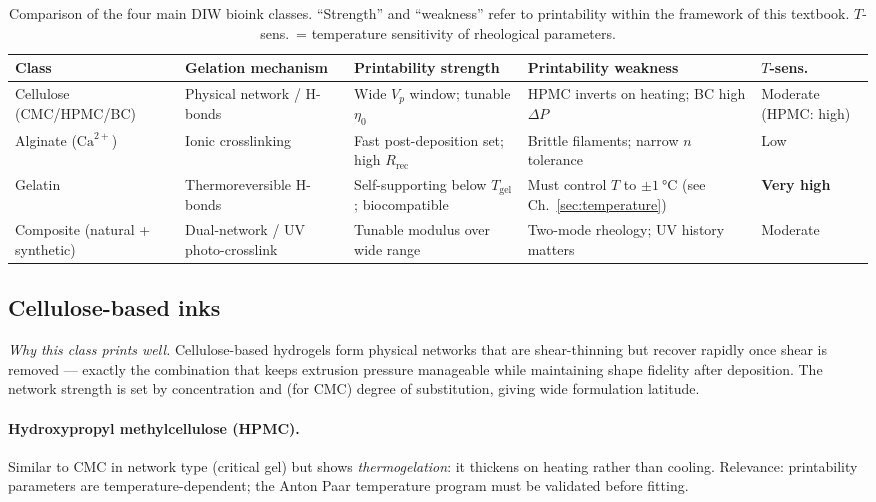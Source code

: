 \documentclass[11pt,a4paper]{article}
\begin{document}
\begin{table}[h]
\centering
\caption{Comparison of the four main DIW bioink classes. ``Strength''
and ``weakness'' refer to printability within the framework of this
textbook. $T$-sens.\ = temperature sensitivity of rheological parameters.}
\label{tab:material_classes}
\small
\begin{tabular}{@{}lllll@{}}
\toprule
\textbf{Class} & \textbf{Gelation mechanism} & \textbf{Printability strength} & \textbf{Printability weakness} & \textbf{$T$-sens.}\\
\midrule
Cellulose (CMC/HPMC/BC)
  & Physical network / H-bonds
  & Wide $V_p$ window; tunable $\eta_0$
  & HPMC inverts on heating; BC high $\Delta P$
  & Moderate (HPMC: high)\\[2pt]
Alginate ($\mathrm{Ca}^{2+}$)
  & Ionic crosslinking
  & Fast post-deposition set; high $R_\mathrm{rec}$
  & Brittle filaments; narrow $n$ tolerance
  & Low\\[2pt]
Gelatin
  & Thermoreversible H-bonds
  & Self-supporting below $T_\mathrm{gel}$; biocompatible
  & Must control $T$ to $\pm\SI{1}{\celsius}$ (see Ch.~\ref{sec:temperature})
  & \textbf{Very high}\\[2pt]
Composite (natural + synthetic)
  & Dual-network / UV photo-crosslink
  & Tunable modulus over wide range
  & Two-mode rheology; UV history matters
  & Moderate\\
\bottomrule
\end{tabular}
\end{table}

\subsection{Cellulose-based inks}

\emph{Why this class prints well.}
Cellulose-based hydrogels form physical networks that are shear-thinning
but recover rapidly once shear is removed — exactly the combination that
keeps extrusion pressure manageable while maintaining shape fidelity
after deposition. The network strength is set by concentration and
(for CMC) degree of substitution, giving wide formulation latitude.

\paragraph{Hydroxypropyl methylcellulose (HPMC).} Similar to CMC in
network type (critical gel) but shows \emph{thermogelation}: it
thickens on heating rather than cooling. Relevance: printability
parameters are temperature-dependent; the Anton Paar temperature program
must be validated before fitting.
\end{document}
